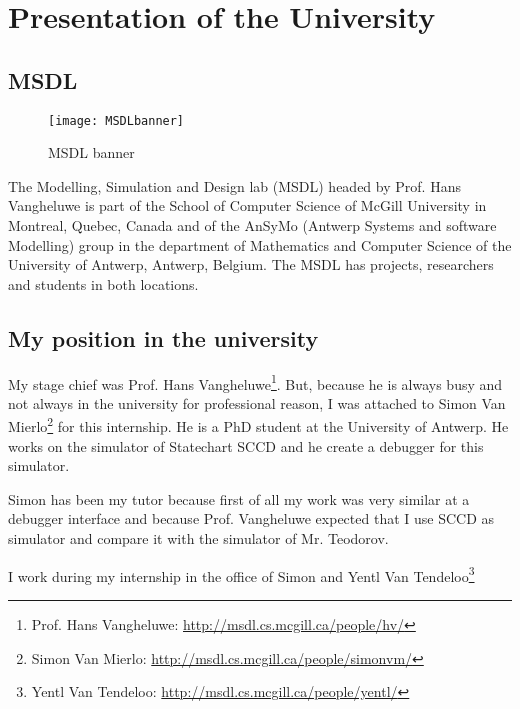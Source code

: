 
\chapter{Presentation of the University}


\section{MSDL}


\begin{figure}[!h]
  \centering
  \texttt{[image: MSDLbanner]}
  \caption{MSDL banner}
  \label{fig:msdl}
\end{figure}

The Modelling, Simulation and Design lab (MSDL) headed by Prof. Hans Vangheluwe is part of the School of Computer Science of McGill University in Montreal, Quebec, Canada and of the AnSyMo (Antwerp Systems and software Modelling) group in the department of Mathematics and Computer Science of the University of Antwerp, Antwerp, Belgium. The MSDL has projects, researchers and students in both locations.\cite{msdl}

\section{My position in the university}

My stage chief was Prof. Hans Vangheluwe\footnote{Prof. Hans Vangheluwe: \url{http://msdl.cs.mcgill.ca/people/hv/}}. But, because he is always busy and not always in the university for professional reason, I was attached to Simon Van Mierlo\footnote{Simon Van Mierlo: \url{http://msdl.cs.mcgill.ca/people/simonvm/}} for this internship. He is a PhD student at the University of Antwerp. He works on the simulator of Statechart SCCD and he create a debugger for this simulator.

Simon has been my tutor because first of all my work was very similar at a debugger interface and because Prof. Vangheluwe expected that I use SCCD as simulator and compare it with the simulator of Mr. Teodorov.

I work during my internship in the office of Simon and Yentl Van Tendeloo\footnote{Yentl Van Tendeloo: \url{http://msdl.cs.mcgill.ca/people/yentl/}}


